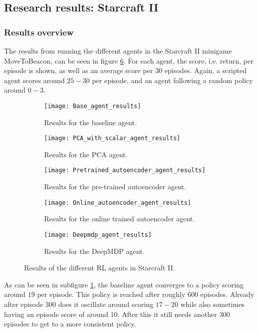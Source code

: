 \subsection{Research results: Starcraft II}\label{research-results-pysc2}
\subsubsection{Results overview}
The results from running the different agents in the Starcraft II minigame MoveToBeacon, can be seen in figure \ref{fig:results-agents}. For each agent, the score, i.e. return, per episode is shown, as well as an average score per $30$ episodes. Again, a scripted agent scores around $25-30$ per episode, and an agent following a random policy around $0-3$.


\begin{figure}[h!]
	\centering
	\begin{subfigure}[b]{0.45\textwidth}
		\texttt{[image: Base\_agent\_results]}
		\caption{Results for the baseline agent.}
		\label{fig:results-base} 
	\end{subfigure}\hfill
	\begin{subfigure}[b]{0.45\textwidth}
		\texttt{[image: PCA\_with\_scalar\_agent\_results]}
		\caption{Results for the PCA agent.}
		\label{fig:results-pca}
	\end{subfigure}
	
	\medskip
	\begin{subfigure}[b]{0.45\textwidth}
		\texttt{[image: Pretrained\_autoencoder\_agent\_results]}
		\caption{Results for the pre-trained autoencoder agent.}
		\label{fig:results-ae}
	\end{subfigure} \hfill
	\begin{subfigure}[b]{0.45\textwidth}
		\texttt{[image: Online\_autoencoder\_agent\_results]}
		\caption{Results for the online trained autoencoder agent.}
		\label{fig:results-online-ae}
	\end{subfigure}
	
	\medskip
	\begin{subfigure}[b]{0.45\textwidth}
		\texttt{[image: Deepmdp\_agent\_results]}
		\caption{Results for the DeepMDP agent.}
		\label{fig:results-deepmdp}
	\end{subfigure}
	\caption{Results of the different RL agents in Starcraft II.}
	\label{fig:results-agents}
\end{figure}

As can be seen in subfigure \ref{fig:results-base}, the baseline agent converges to a policy scoring around $19$ per episode. This policy is reached after roughly $600$ episodes. Already after episode $300$ does it oscillate around scoring $17-20$ while also sometimes having an episode score of around $10$. After this it still needs another $300$ episodes to get to a more consistent policy.

